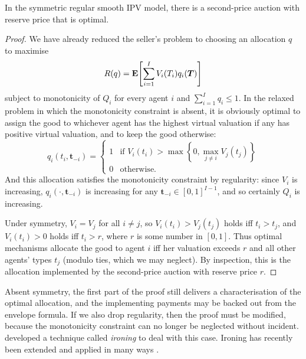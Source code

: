 \begin{theorem}
	\label{theorem:MyersonAuction}
	In the symmetric regular smooth IPV model,
	there is a second-price auction with reserve price
	that is optimal.
\end{theorem}

\begin{proof}
	We have already reduced the seller's problem to choosing an allocation $q$ to maximise
	\begin{equation*}
		R(q) = \E\left[ \sum_{i=1}^I V_i(T_i) q_i(\boldsymbol{T}) \right]
	\end{equation*}
	subject to monotonicity of $Q_i$ for every agent $i$ and $\sum_{i=1}^I q_i \leq 1$.
	In the relaxed problem in which the monotonicity constraint is absent,
	it is obviously optimal
	to assign the good to whichever agent has the highest virtual valuation if any has positive virtual valuation, and to keep the good otherwise:
	\begin{equation*}
		q_i(t_i,\boldsymbol{t}_{-i})
		= 
		\begin{cases}
			1
			& \text{if $V_i(t_i) > \max\left\{ 0, \max_{j \neq i} V_j(t_j) \right\}$}
			\\
			0
			& \text{otherwise.}
		\end{cases}
	\end{equation*}
	And this allocation satisfies the monotonicity constraint
	by regularity:
	since $V_i$ is increasing,
	$q_i(\cdot,\boldsymbol{t}_{-i})$ is increasing for any $\boldsymbol{t}_{-i} \in [0,1]^{I-1}$,
	and so certainly $Q_i$ is increasing.

	Under symmetry, $V_i = V_j$ for all $i \neq j$,
	so $V_i(t_i) > V_j(t_j)$ holds iff $t_i > t_j$,
	and $V_i(t_i) > 0$ holds iff $t_i > r$, where $r$ is some number in $[0,1]$.
	Thus optimal mechanisms allocate the good to agent $i$ iff her valuation exceeds $r$ and all other agents' types $t_j$
	(modulo ties, which we may neglect).
	By inspection, this is the allocation implemented by the second-price auction with reserve price $r$.
\end{proof}


\begin{remark}
	\label{remark:Myerson_general}
	Absent symmetry, the first part of the proof still delivers a characterisation of the optimal allocation,
	and the implementing payments may be backed out from the envelope formula.
	If we also drop regularity, then the proof must be modified, because the monotonicity constraint can no longer be neglected without incident.
	\textcite{Myerson1981} developed a technique called \emph{ironing} to deal with this case.
	Ironing has recently been extended and applied in many ways
	\parencite[e.g.][]{Toikka2011,Condorelli2012,Condorelli2013,KleinerMoldovanuStrack2021,DworczakKominersAkbarpour2021,LoertscherMuir2022,OnuchicRay2022iron,JewittQuigleyInprogress}.
\end{remark}


